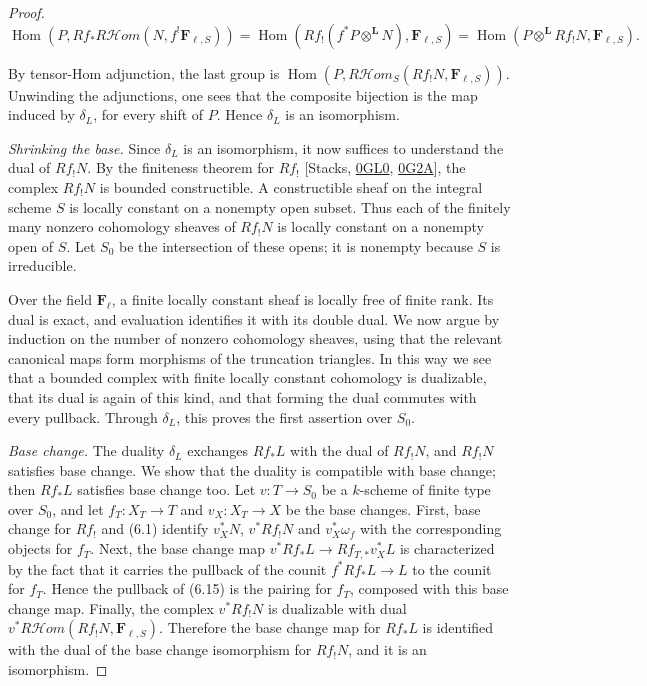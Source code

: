 \documentclass[11pt]{article}
\providecommand{\Fell}{}\renewcommand{\Fell}{\mathbf F_\ell}
\providecommand{\Hom}{}\renewcommand{\Hom}{\operatorname{Hom}}
\providecommand{\cHom}{}\renewcommand{\cHom}{R\mathcal{H}\!om}
\begin{document}
\begin{proof}[{Proof}]
\[
\Hom(P,Rf_*\cHom(N,f^!\mathbf F_{\ell,S}))
=\Hom(Rf_!(f^*P\otimes^{\mathbf L}N),\mathbf F_{\ell,S})
=\Hom(P\otimes^{\mathbf L}Rf_!N,\mathbf F_{\ell,S}).
\]

By tensor-Hom adjunction, the last group is \(\Hom(P,\cHom_S(Rf_!N,\mathbf F_{\ell,S}))\). Unwinding the adjunctions, one sees that the composite bijection is the map induced by \(\delta_L\), for every shift of \(P\). Hence \(\delta_L\) is an isomorphism.

\emph{Shrinking the base.} Since \(\delta_L\) is an isomorphism, it now suffices to understand the dual of \(Rf_!N\). By the finiteness theorem for \(Rf_!\) [Stacks, \href{https://stacks.math.columbia.edu/tag/0GL0}{0GL0}, \href{https://stacks.math.columbia.edu/tag/0G2A}{0G2A}], the complex \(Rf_!N\) is bounded constructible. A constructible sheaf on the integral scheme \(S\) is locally constant on a nonempty open subset. Thus each of the finitely many nonzero cohomology sheaves of \(Rf_!N\) is locally constant on a nonempty open of \(S\). Let \(S_0\) be the intersection of these opens; it is nonempty because \(S\) is irreducible.

Over the field \(\Fell\), a finite locally constant sheaf is locally free of finite rank. Its dual is exact, and evaluation identifies it with its double dual. We now argue by induction on the number of nonzero cohomology sheaves, using that the relevant canonical maps form morphisms of the truncation triangles. In this way we see that a bounded complex with finite locally constant cohomology is dualizable, that its dual is again of this kind, and that forming the dual commutes with every pullback. Through \(\delta_L\), this proves the first assertion over \(S_0\).

\emph{Base change.} The duality \(\delta_L\) exchanges \(Rf_*L\) with the dual of \(Rf_!N\), and \(Rf_!N\) satisfies base change. We show that the duality is compatible with base change; then \(Rf_*L\) satisfies base change too. Let \(v:T\to S_0\) be a \(k\)-scheme of finite type over \(S_0\), and let \(f_T:X_T\to T\) and \(v_X:X_T\to X\) be the base changes. First, base change for \(Rf_!\) and (6.1) identify \(v_X^*N\), \(v^*Rf_!N\) and \(v_X^*\omega_f\) with the corresponding objects for \(f_T\). Next, the base change map \(v^*Rf_*L\to Rf_{T,*}v_X^*L\) is characterized by the fact that it carries the pullback of the counit \(f^*Rf_*L\to L\) to the counit for \(f_T\). Hence the pullback of (6.15) is the pairing for \(f_T\), composed with this base change map. Finally, the complex \(v^*Rf_!N\) is dualizable with dual \(v^*\cHom(Rf_!N,\mathbf F_{\ell,S})\). Therefore the base change map for \(Rf_*L\) is identified with the dual of the base change isomorphism for \(Rf_!N\), and it is an isomorphism.
\end{proof}
\end{document}

